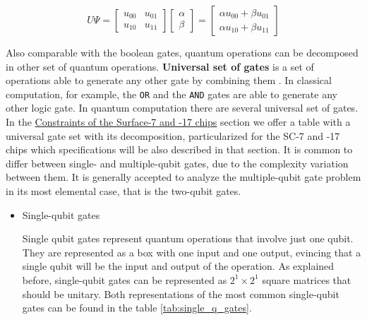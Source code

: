 \begin{itemize}
\begin{equation}
\label{eq:org6f1f064}
U \Psi=\begin{bmatrix}u_{00}&u_{01}\\u_{10}&u_{11}\end{bmatrix} \begin{bmatrix}\alpha \\ \beta \end{bmatrix} = \begin{bmatrix}\alpha u_{00} + \beta u_{01} \\ \alpha u_{10} + \beta u_{11} \end{bmatrix}
\end{equation}

Also comparable with the boolean gates, quantum operations can be decomposed in other set of quantum operations.
\textbf{Universal set of gates} is a set of operations able to generate any other gate by combining them \cite{Nielsen_2009}.
In classical computation, for example, the \texttt{OR} and the \texttt{AND} gates are able to generate any other logic gate.
In quantum computation there are several universal set of gates.
In the \href{chapter-3.org}{Constraints of the Surface-7 and -17 chips} section we offer a table with a universal gate set with its decomposition, particularized for the SC-7 and -17 chips which specifications will be also described in that section.
It is common to differ between single- and multiple-qubit gates, due to the complexity variation between them.
It is generally accepted to analyze the multiple-qubit gate problem in its most elemental case, that is the two-qubit gates.

\begin{itemize}
\item Single-qubit gates
\label{sec:orgd8206ee}

Single qubit gates represent quantum operations that involve just one qubit.
They are represented as a box with one input and one output, evincing that a single qubit will be the input and output of the operation.
As explained before, single-qubit gates can be represented as \(2^1 \times 2^1\) square matrices that should be unitary.
Both representations of the most common single-qubit gates can be found in the table \ref{tab:single_q_gates}.


\end{itemize}
\end{itemize}
